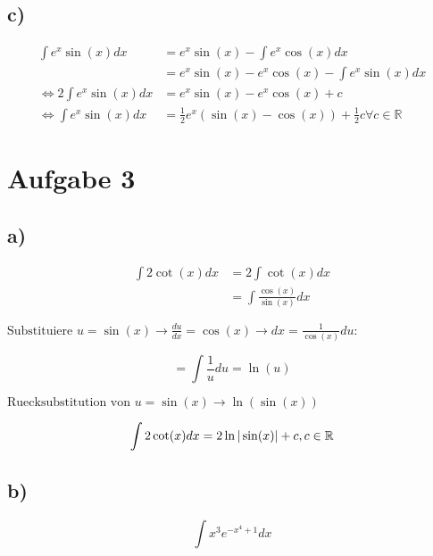 \documentclass[a4paper, 11pt]{article}
\begin{document}
\subsection{c)}
\label{sec:org54c996c}
\begin{align*}
	\int e^x \sin(x) dx &= e^x \sin(x) - \int e^x \cos(x) dx \\
				   &= e^x \sin(x) - e^x \cos(x) - \int e^x \sin(x) dx \\
	\Leftrightarrow 2\int e^x \sin(x) dx &= e^x \sin(x) - e^x \cos(x) + c \\
	\Leftrightarrow \int e^x \sin(x) dx &= \frac{1}{2}e^x (\sin(x) - \cos(x)) + \frac{1}{2}c \forall c \in \mathbb{R}
\end{align*}

\section{Aufgabe 3}
\label{sec:orgb90769c}
\subsection{a)}
\label{sec:orge817eb6}
\begin{align*}
    \int 2\cot(x)dx &= 2 \int \cot(x)dx \\
        &= \int \frac{\cos(x)}{\sin(x)}dx
\end{align*}

\begin{math}
    \text{Substituiere } u = \sin(x) \rightarrow \frac{du}{dx} = \cos(x) \rightarrow dx = \frac{1}{\cos(x)}du:
\end{math}

\begin{equation*}
    = \int \frac{1}{u}du = \ln(u)
\end{equation*}

\begin{math}
    \text{Ruecksubstitution von } u = \sin(x) \rightarrow \ln(\sin(x))
\end{math}

\begin{equation*}
    \int 2\cot(x) dx = 2\ln|\sin(x)| + c, c \in \mathbb{R}
\end{equation*}

\subsection{b)}
\label{sec:org9752cba}

\begin{equation*}
    \int x^3e^{-x^4+1}dx
\end{equation*}
\end{document}
